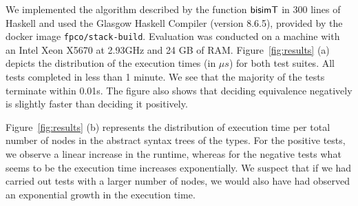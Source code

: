 
We implemented the algorithm described by the function $\mathsf{bisimT}$ in
300 lines of Haskell and used the Glasgow Haskell Compiler (version
8.6.5), provided by the docker image
\texttt{fpco/stack-build}. Evaluation was conducted on a machine with
an Intel Xeon X5670 at 2.93GHz and 24 GB of RAM.
%
Figure~\ref{fig:results} (a) depicts the distribution of the execution
times (in $\mu s$) for both test suites. All tests completed in less
than 1 minute. We see that the majority of the tests terminate within
0.01s.  The figure also shows that deciding equivalence negatively is
slightly faster than deciding it positively.



Figure~\ref{fig:results} (b) represents the distribution of execution
time per total number of nodes in the abstract syntax trees of the
types. For the positive tests, we observe a linear increase in the
runtime, whereas for the negative tests what seems to be the execution
time increases exponentially.  We suspect that if we had carried out
tests with a larger number of nodes, we would also have had observed
an exponential growth in the execution time.

